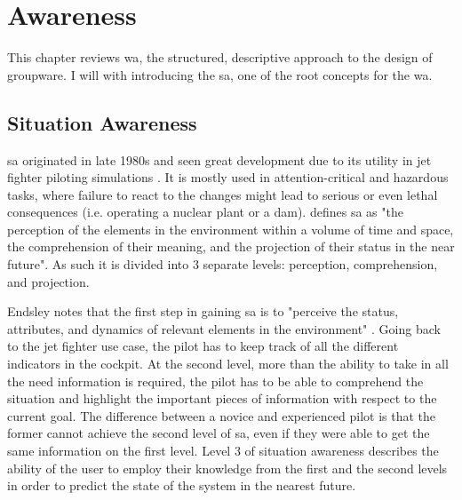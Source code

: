 
\chapter{Awareness}

This chapter reviews \gls{wa}, the structured, descriptive approach to the design of groupware. I will with introducing the \gls{sa}, one of the root concepts for the \gls{wa}.

\section{Situation Awareness}


\gls{sa} originated in late 1980s and seen great development  due to its utility in jet fighter piloting simulations \cite{endsley_situation_1988}. It is mostly used in attention-critical and hazardous tasks, where failure to react to the changes might lead to serious or even lethal consequences (i.e. operating a nuclear plant or a dam).
\cite{endsley_design_1988} defines \gls{sa} as "the perception of the elements in the environment within a volume of time and space, the comprehension of their meaning, and the projection of their status in the near future". As such it is divided into 3 separate levels: perception, comprehension, and projection.

Endsley notes that the first step in gaining \gls{sa} is to "perceive the status, attributes, and dynamics of relevant elements in the environment" \cite{salvendy_copyright_nodate}. Going back to the jet fighter use case, the pilot has to keep track of all the different indicators in the cockpit. At the second level, more than the ability to take in all the need information is required, the pilot has to be able to comprehend the situation and highlight the important pieces of information with respect to the current goal. The difference between a novice and experienced pilot is that the former cannot achieve the second level of \gls{sa}, even if they were able to get the same information on the first level. Level 3 of situation awareness describes the ability of the user to employ their knowledge from the first and the second levels in order to predict the state of the system in the nearest future.

